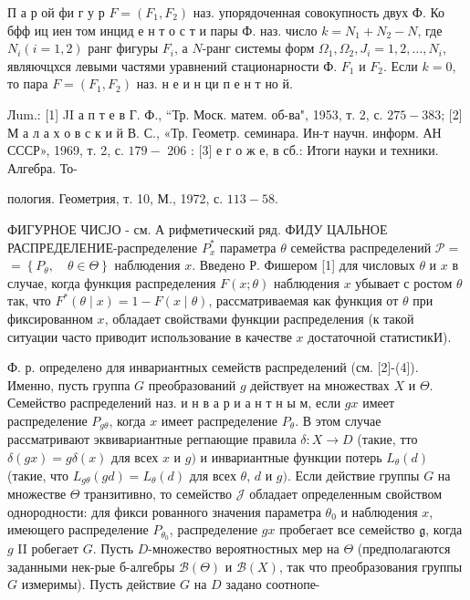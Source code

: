 \documentclass[10pt]{article}
\begin{document}
П а р ой фи г у р $F=\left(F_{1}, F_{2}\right)$ наз. упорядоченная совокупность двух Ф. Ко бфф иц иен том инцид е н т о с т и пары Ф. наз. число $k=N_{1}+N_{2}-N$, где $N_{i}(i=1,2)$ ранг фигуры $F_{i}$, а $N$-ранг системы форм $\Omega_{1}, \Omega_{2}, J_{i}=1,2, \ldots, N_{i}$, являючцхся левыми частями уравнений стационарности Ф. $F_{1}$ и $F_{2}$. Если $k=0$, то пара $F=\left(F_{1}, F_{2}\right)$ наз. н е и н ци п $е$ н т но й.



Лum.: [1] JI а п т е в Г. Ф., “Тр. Моск. матем. об-ва", 1953, т. 2, с. $275-383$; [2] М а л а х о в с к и й В. С., «Тр. Геометр. семинара. Ин-т научн. информ. АН СССР», 1969, т. 2, с. $179-$ 206 : [3] е г о ж е, в сб.: Итоги науки и техники. Алгебра. То-

пология. Геометрия, т. 10, М., 1972, с. $113-58$.



ФИГУРНОЕ ЧИСЈО - см. А рифметический ряд. ФИДУ ЦАЛЬНОЕ РАСПРЕДЕЛЕНИЕ-распределение $P_{x}^{*}$ параметра $\theta$ семейства распределений $\mathscr{P}=$ $=\left\{P_{\theta}, \quad \theta \in \Theta\right\}$ наблюдения $x$. Введено Р. Фишером [1] для числовых $\theta$ и $x$ в случае, когда функция распределения $F(x ; \theta)$ наблюдения $x$ убывает с ростом $\theta$ так, что $F^{*}(\theta \mid x)=1-F(x \mid \theta)$, рассматриваемая как функция от $\theta$ при фиксированном $x$, обладает свойствами функции распределения (к такой ситуации часто приводит использование в качестве $x$ достаточной статистикИ).



Ф. р. определено для инвариантных семейств распределений (см. [2]-(4]). Именно, пусть группа $G$ преобразований $g$ действует на множествах $X$ и $\Theta$. Семейство распределений наз. и н в а р и а н т н ы м, если $g x$ имеет распределение $P_{g \theta}$, когда $x$ имеет распределение $P_{\theta}$. В этом случае рассматривают эквивариантные регпающие правила $\delta: X \longrightarrow D$ (такие, тто $\delta(g x)=g \delta(x)$ для всех $x$ и $g)$ и инвариантные функции потерь $L_{\theta}(d)$ (такие, что $L_{g \theta}(g d)=L_{\theta}(d)$ для всех $\theta$, $d$ и $g)$. Если действие группы $G$ на множестве $\Theta$ транзитивно, то семейство $\mathscr{J}$ обладает определенным свойством однородности: для фикси рованного значения параметра $\theta_{0}$ и наблюдения $x$, имеющего распределение $P_{\theta_{0}}$, распределение $g x$ пробегает все семейство $\mathfrak{g}$, когда $g$ II робегает $G$. Пусть $D$-множество вероятностных мер на $\Theta$ (предполагаются заданными нек-рые б-алгебры $\mathscr{B}(\Theta)$ и $\mathscr{B}(X)$, так что преобразования группы $G$ измеримы). Пусть действие $G$ на $D$ задано соотнопе-
\end{document}

